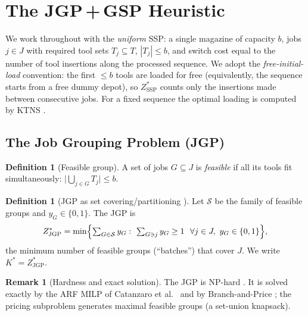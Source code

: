 \documentclass[11pt,a4paper]{article}
\theoremstyle{plain}
\theoremstyle{definition}
\newtheorem{definition}[theorem]{Definition}
\newtheorem{remark}[theorem]{Remark}
\newcommand{\Kstar}{K^{*}}
\newcommand{\ZJGP}{Z_{\mathrm{JGP}}^{*}}
\newcommand{\ZSSP}{Z_{\mathrm{SSP}}^{*}}
\begin{document}
\section{The JGP\,+\,GSP Heuristic}
\label{sec:heuristic}

We work throughout with the \emph{uniform} SSP: a single magazine of capacity $b$,
jobs $j\in J$ with required tool sets $T_j\subseteq T$, $|T_j|\le b$, and switch cost
equal to the number of tool insertions along the processed sequence. We adopt the
\emph{free-initial-load} convention: the first $\le b$ tools are loaded for free
(equivalently, the sequence starts from a free dummy depot), so $\ZSSP$ counts only
the insertions made between consecutive jobs. For a fixed sequence the optimal loading
is computed by KTNS \cite{Tang1988}.

\subsection{The Job Grouping Problem (JGP)}

\begin{definition}[Feasible group]
A set of jobs $G\subseteq J$ is \emph{feasible} if all its tools fit simultaneously:
$\bigl|\bigcup_{j\in G}T_j\bigr|\le b$.
\end{definition}

\begin{definition}[JGP as set covering/partitioning \cite{Crama1994Column,Catanzaro2015}]
Let $\mathcal{S}$ be the family of feasible groups and $y_G\in\{0,1\}$. The JGP is
\[
  \ZJGP=\min\Bigl\{\textstyle\sum_{G\in\mathcal{S}}y_G:\
  \sum_{G\ni j}y_G\ge 1\ \ \forall j\in J,\ y_G\in\{0,1\}\Bigr\},
\]
the minimum number of feasible groups (``batches'') that cover $J$. We write
$\Kstar=\ZJGP$.
\end{definition}

\begin{remark}[Hardness and exact solution]
The JGP is NP-hard \cite{Crama1994Column}.
It is solved exactly by the ARF MILP of
Catanzaro et al.\ \cite{Catanzaro2015} and by Branch-and-Price \cite{Otiai2024}; the
pricing subproblem generates maximal feasible groups (a set-union knapsack).
\end{remark}
\end{document}
